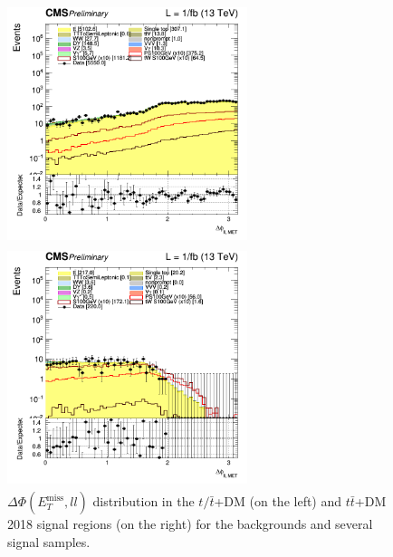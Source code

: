 \documentclass[a4paper, 10pt, openright]{report}
\begin{document}
\begin{itemize}
\begin{figure}[htbp]
\begin{minipage}[c]{.32\linewidth}
{	}
   \end{minipage} \hfill
   \label{fig:scheme_deltaphi}
  \end{figure}
   
\begin{figure}[htbp]
\centering
\begin{minipage}[b]{.48\textwidth}
\includegraphics[width=7cm, height=7cm]{figs/log_cratio_topCR_ll_2j_signal1_dphillmet.png}
\end{minipage}\hfill
\begin{minipage}[b]{.48\textwidth}
\includegraphics[width=7cm, height=7cm]{figs/log_cratio_topCR_ll_2j_signal0_dphillmet.png}
\end{minipage} \hfill
\caption{$\Delta \Phi(E_{T}^{\text{miss}}, ll)$ distribution in the $t/ \bar t$+DM (on the left) and $t \bar t$+DM 2018 signal regions (on the right) for the backgrounds and several signal samples.}
\label{fig:SRdisc4}
\end{figure}


\end{itemize}
\end{document}
